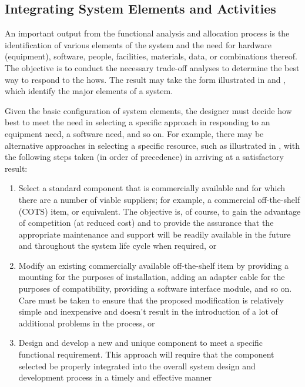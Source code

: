 \subsection{Integrating System Elements and Activities}

An important output from the functional analysis and allocation process is the identification of various elements of the system and the need for hardware (equipment), software, people, facilities, materials, data, or combinations thereof. The objective is to conduct the necessary trade-off analyses to determine the best way to respond to the hows. The result may take the form illustrated in and , which identify the major elements of a system.

Given the basic configuration of system elements, the designer must decide how best to meet the need in selecting a specific approach in responding to an equipment need, a software need, and so on. For example, there may be alternative approaches in selecting a specific resource, such as illustrated in , with the following steps taken (in order of precedence) in arriving at a satisfactory result:

\begin{enumerate}
\item Select a standard component that is commercially available and for which there are a number of viable suppliers; for example, a commercial off-the-shelf (COTS) item, or equivalent. The objective is, of course, to gain the advantage of competition (at reduced cost) and to provide the assurance that the appropriate maintenance and support will be readily available in the future and throughout the system life cycle when required, or
\item Modify an existing commercially available off-the-shelf item by providing a mounting for the purposes of installation, adding an adapter cable for the purposes of compatibility, providing a software interface module, and so on. Care must be taken to ensure that the proposed modification is relatively simple and inexpensive and doesn’t result in the introduction of a lot of additional problems in the process, or
\item Design and develop a new and unique component to meet a specific functional requirement. This approach will require that the component selected be properly integrated into the overall system design and development process in a timely and effective manner
\end{enumerate}

